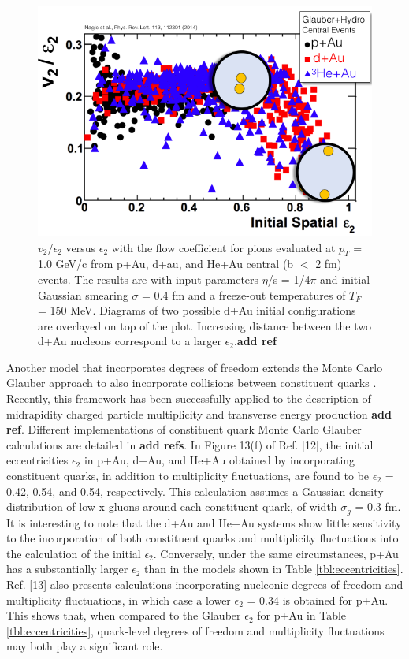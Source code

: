 \begin{figure}[!ht]
\begin{center}
\includegraphics[width=0.6\linewidth]{figs/v2_e2_ampt.png}
\caption{$v_2/\epsilon_2$ versus $\epsilon_2$ with the flow coefficient
for pions evaluated at $p_T$ = 1.0 GeV/c from p+Au,
d+au, and He+Au central (b $<$ 2 fm) events. The results
are with input parameters $\eta$/s = 1/4$\pi$ and initial Gaussian
smearing $\sigma$ = 0.4 fm and a freeze-out temperatures of $T_F$ = 150
MeV. Diagrams of two possible d+Au initial configurations are overlayed on top of the plot. Increasing distance between the two d+Au nucleons correspond to a larger $\epsilon_2$.\textbf{add ref}}
\label{fig:v2_epsi2_ampt}
\end{center}
\end{figure}



Another model that incorporates degrees of freedom extends the Monte Carlo Glauber approach
to also incorporate collisions between constituent quarks . Recently, this framework has been successfully applied
to the description of midrapidity charged particle multiplicity and transverse energy production \textbf{add ref}. Different
implementations of constituent quark Monte Carlo Glauber calculations are detailed in \textbf{add refs}. In Figure 13(f) of
Ref. [12], the initial eccentricities $\epsilon_2$ in p+Au, d+Au, and He+Au obtained by incorporating constituent quarks, in
addition to multiplicity fluctuations, are found to be $\epsilon_2$ = 0.42, 0.54, and 0.54, respectively. This calculation assumes
a Gaussian density distribution of low-x gluons around each constituent quark, of width $\sigma_g$ = 0.3 fm. It is interesting
to note that the d+Au and He+Au systems show little sensitivity to the incorporation of both constituent quarks
 and multiplicity fluctuations into the calculation of the initial $\epsilon_2$. Conversely, under the same circumstances, p+Au
 has a substantially larger $\epsilon_2$ than in the models shown in Table \ref{tbl:eccentricities}. Ref. [13] also presents calculations incorporating
 nucleonic degrees of freedom and multiplicity fluctuations, in which case a lower $\epsilon_2$ = 0.34 is obtained for p+Au. This
 shows that, when compared to the Glauber $\epsilon_2$ for p+Au in Table \ref{tbl:eccentricities}, quark-level degrees of freedom and multiplicity
 fluctuations may both play a significant role. 

